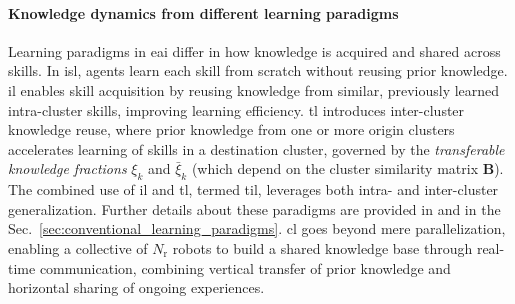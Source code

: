 \documentclass[12pt]{article}
\renewcommand{\emph}[1]{\textit{#1}}
\begin{document}
\paragraph*{Knowledge dynamics from different learning paradigms}
Learning paradigms in \ac{eai} differ in how knowledge is acquired and shared across skills. In \ac{isl}, agents learn each skill from scratch without reusing prior knowledge. \Ac{il} enables skill acquisition by reusing knowledge from similar, previously learned intra-cluster skills, improving learning efficiency. \Ac{tl} introduces inter-cluster knowledge reuse, where prior knowledge from one or more origin clusters accelerates learning of skills in a destination cluster, governed by the \emph{transferable knowledge fractions} $\xi_k$ and $\bar{\xi}_k$ (which depend on the cluster similarity matrix $\bm{B}$). The combined use of \ac{il} and \ac{tl}, termed \ac{til}, leverages both intra- and inter-cluster generalization. Further details about these paradigms are provided in  and in the  Sec.~\ref{sec:conventional_learning_paradigms}. \Ac{cl} goes beyond mere parallelization, enabling a collective of $N_\mathrm{r}$ robots to build a shared knowledge base through real-time communication, combining vertical transfer of prior knowledge and horizontal sharing of ongoing experiences.

\end{document}
